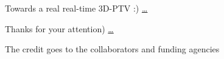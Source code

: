   \begin{frame}{Towards a real real-time 3D-PTV :) \href{https://www.dropbox.com/s/os4tz91gq0ginp8/real_time_3dptv_calibration.mp4?raw=1}{\ldots}}
  \end{frame}

  
  \begin{frame}{Thanks for your attention) \href{https://www.dropbox.com/s/resn98zu5l7vtty/real_time_3dptv.mp4?raw=1}{\ldots}}
  \end{frame}




\begin{frame}[label=credit-1a]{The credit goes to the collaborators and funding agencies}
\begin{multicols}{2}
\centering
{} 
\end{multicols}
\end{frame}
